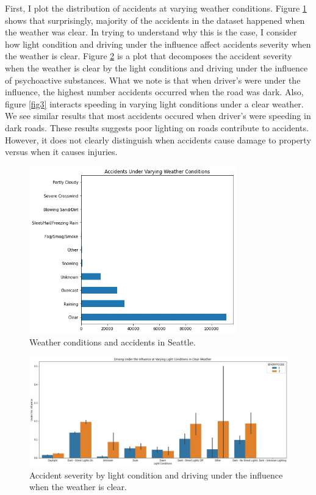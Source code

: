 \documentclass[a4paper,12pt]{article}
\begin{document}
First, I plot the distribution of accidents at varying weather conditions. Figure \ref{fig1} shows that surprisingly, majority of the accidents in the dataset happened when the weather was clear. In trying to understand why this is the case, I consider how light condition and driving under the influence affect accidents severity when the weather is clear. Figure \ref{fig2} is a plot that decomposes the accident severity when the weather is clear by the light conditions and driving under the influence of psychoactive substances. What we note is that when driver's were under the influence, the highest number accidents occurred when the road was dark. Also, figure \ref{fig3} interacts speeding in varying light conditions under a clear weather. We see similar results that most accidents occured when driver's were speeding in dark roads. These results suggests poor lighting on roads contribute to accidents. However, it does not clearly distinguish when accidents cause damage to property versus when it causes injuries. \\


\begin{figure}[H]
	\centering
	\includegraphics[width=0.8\textwidth]{weather.jpg}
	\caption{Weather conditions and accidents in Seattle.}
	\label{fig1}
\end{figure}


\begin{figure}[H]
	\centering
	\includegraphics[width=1.0\textwidth]{li_un_wet.jpg}
	\caption{Accident severity by light condition and driving under the influence when the weather is clear. }
	\label{fig2}
\end{figure}
\end{document}
